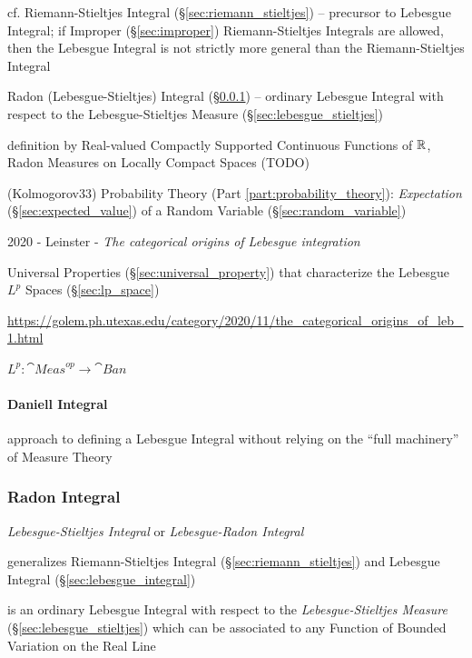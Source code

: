 {cf. Riemann-Stieltjes Integral (\S\ref{sec:riemann_stieltjes}) -- precursor to
Lebesgue Integral; if Improper (\S\ref{sec:improper}) Riemann-Stieltjes
Integrals are allowed, then the Lebesgue Integral is not strictly more general
than the Riemann-Stieltjes Integral

\fist Radon (Lebesgue-Stieltjes) Integral (\S\ref{sec:radon_integral}) --
ordinary Lebesgue Integral with respect to the Lebesgue-Stieltjes Measure
(\S\ref{sec:lebesgue_stieltjes})

definition by Real-valued Compactly Supported Continuous Functions of $\mathbb{R}$,
Radon Measures on Locally Compact Spaces
(TODO)

(Kolmogorov33) Probability Theory (Part \ref{part:probability_theory}):
\emph{Expectation} (\S\ref{sec:expected_value}) of a Random Variable
(\S\ref{sec:random_variable})

\asterism

2020 - Leinster - \emph{The categorical origins of Lebesgue integration}

Universal Properties (\S\ref{sec:universal_property}) that characterize the
Lebesgue $L^p$ Spaces (\S\ref{sec:lp_space})

\url{https://golem.ph.utexas.edu/category/2020/11/the_categorical_origins_of_leb_1.html}

$L^p : \cat{Meas}^{op} \to \cat{Ban}$



\paragraph{Daniell Integral}\label{sec:daniell_integral}\hfill

approach to defining a Lebesgue Integral without relying on the ``full
machinery'' of Measure Theory



\subsubsection{Radon Integral}\label{sec:radon_integral}

\emph{Lebesgue-Stieltjes Integral} or \emph{Lebesgue-Radon Integral}

generalizes Riemann-Stieltjes Integral (\S\ref{sec:riemann_stieltjes}) and
Lebesgue Integral (\S\ref{sec:lebesgue_integral})

is an ordinary Lebesgue Integral with respect to the \emph{Lebesgue-Stieltjes
  Measure} (\S\ref{sec:lebesgue_stieltjes}) which can be associated to any
Function of Bounded Variation on the Real Line

}

